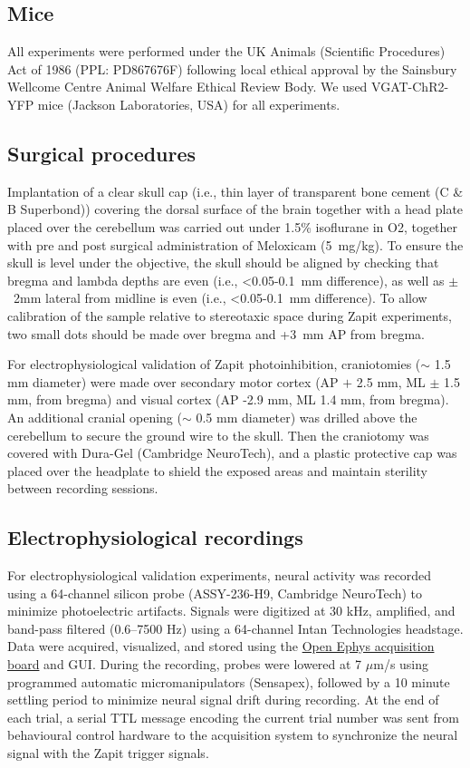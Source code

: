 \subsection{Mice}
All experiments were performed under the UK Animals (Scientific Procedures) Act of 1986 (PPL: PD867676F) following local ethical approval by the Sainsbury Wellcome Centre Animal Welfare Ethical Review Body.
We used VGAT-ChR2-YFP mice (Jackson Laboratories, USA) for all experiments.

\subsection{Surgical procedures}
Implantation of a clear skull cap (i.e., thin layer of transparent bone cement (C \& B Superbond)) covering the dorsal surface of the brain together with a head plate placed over the cerebellum was carried out under 1.5\% isoflurane in O2, together with pre and post surgical administration of Meloxicam (5~mg/kg).
To ensure the skull is level under the objective, the skull should be aligned by checking that bregma and lambda depths are even (i.e., <0.05-0.1~mm difference), as well as $\pm$~2mm lateral from midline is even (i.e., <0.05-0.1~mm difference).
To allow calibration of the sample relative to stereotaxic space during Zapit experiments, two small dots should be made over bregma and +3~mm AP from bregma.

For electrophysiological validation of Zapit photoinhibition, craniotomies ($\sim$ 1.5 mm diameter) were made over secondary motor cortex  (AP $+$ 2.5 mm, ML $\pm$ 1.5 mm, from bregma) and visual cortex (AP -2.9 mm, ML 1.4 mm, from bregma).
An additional cranial opening ($\sim$ 0.5 mm diameter) was drilled above the cerebellum to secure the ground wire to the skull.
Then the craniotomy was covered with Dura-Gel (Cambridge NeuroTech), and a plastic protective cap was placed over the headplate to shield the exposed areas and maintain sterility between recording sessions.


\subsection{Electrophysiological recordings}

For electrophysiological validation experiments, neural activity was recorded using a 64-channel silicon probe (ASSY-236-H9, Cambridge NeuroTech) to minimize photoelectric artifacts.
Signals were digitized at 30 kHz, amplified, and band-pass filtered (0.6–7500 Hz) using a 64-channel Intan Technologies headstage.
Data were acquired, visualized, and stored using the \href{https://open-ephys.github.io/acq-board-docs/}{Open Ephys acquisition board} and GUI.
During the recording, probes were lowered at 7 $\mu$m/s using programmed automatic micromanipulators (Sensapex), followed by a 10 minute settling period to minimize neural signal drift during recording.
At the end of each trial, a serial TTL message encoding the current trial number was sent from behavioural control hardware to the acquisition system to synchronize the neural signal with the Zapit trigger signals.

